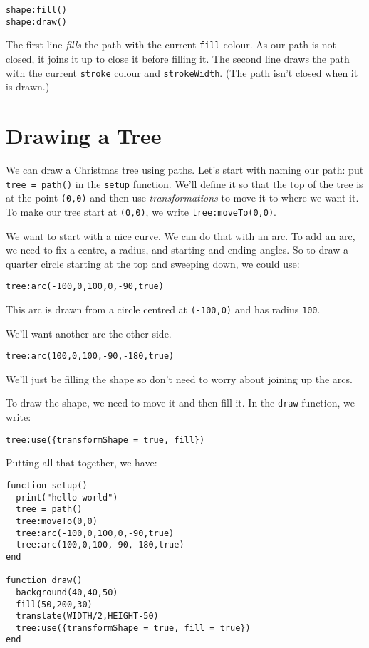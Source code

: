 \documentclass[
  xhtml,%
  use filename%
]{internet}
\begin{document}
\begin{verbatim}
shape:fill()
shape:draw()
\end{verbatim}

The first line \emph{fills} the path with the current \verb+fill+ colour.
As our path is not closed, it joins it up to close it before filling it.
The second line draws the path with the current \verb+stroke+ colour and \verb+strokeWidth+.
(The path isn't closed when it is drawn.)

\section{Drawing a Tree}

We can draw a Christmas tree using paths.
Let's start with naming our path: put \verb+tree = path()+ in the \verb+setup+ function.
We'll define it so that the top of the tree is at the point \verb+(0,0)+ and then use \emph{transformations} to move it to where we want it.
To make our tree start at \verb+(0,0)+, we write \verb+tree:moveTo(0,0)+.

We want to start with a nice curve.
We can do that with an arc.
To add an arc, we need to fix a centre, a radius, and starting and ending angles.
So to draw a quarter circle starting at the top and sweeping down, we could use:

\begin{verbatim}
tree:arc(-100,0,100,0,-90,true)
\end{verbatim}

This arc is drawn from a circle centred at \verb+(-100,0)+ and has radius \verb+100+.

We'll want another arc the other side.

\begin{verbatim}
tree:arc(100,0,100,-90,-180,true)
\end{verbatim}

We'll just be filling the shape so don't need to worry about joining up the arcs.

To draw the shape, we need to move it and then fill it.
In the \verb+draw+ function, we write:

\begin{verbatim}
tree:use({transformShape = true, fill})
\end{verbatim}

Putting all that together, we have:

\begin{verbatim}
function setup()
  print("hello world")
  tree = path()
  tree:moveTo(0,0)
  tree:arc(-100,0,100,0,-90,true)
  tree:arc(100,0,100,-90,-180,true)
end

function draw()
  background(40,40,50)
  fill(50,200,30)
  translate(WIDTH/2,HEIGHT-50)
  tree:use({transformShape = true, fill = true})
end
\end{verbatim}
\end{document}

